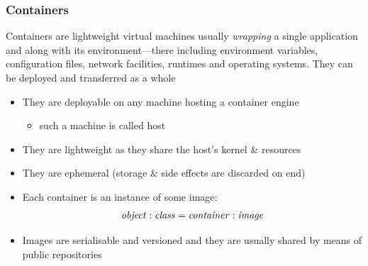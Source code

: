 \documentclass[presentation]{beamer}\mode<presentation>{\usetheme{AMSBolognaFC}}
\begin{document}
\begin{frame}
\frametitle{Containers}

    \begin{block}{}
        Containers are \alert{lightweight} virtual machines usually \emph{wrapping} a \alert{single application} and along with its \alert{environment}---there including environment variables, configuration files, network facilities, runtimes and operating systems. They can be deployed and transferred as a whole
    \end{block}
    \begin{itemize}
        \item They are deployable on any machine hosting a \alert{container engine}
        \begin{itemize}\small
            \item such a machine is called \alert{host}
        \end{itemize}

        \item They are \alert{lightweight} as they share the host's kernel \& resources

        \item They are \alert{ephemeral} (storage \& side effects are discarded on end)

        \item Each container is an instance of some \alert{image}:
        \begin{equation*}\small
            \mathit{object} : \mathit{class} = \mathit{container} : \mathit{image}
        \end{equation*}

        \item Images are serialisable and versioned and they are usually shared by means of public \alert{repositories}
    \end{itemize}

\end{frame}
\end{document}
